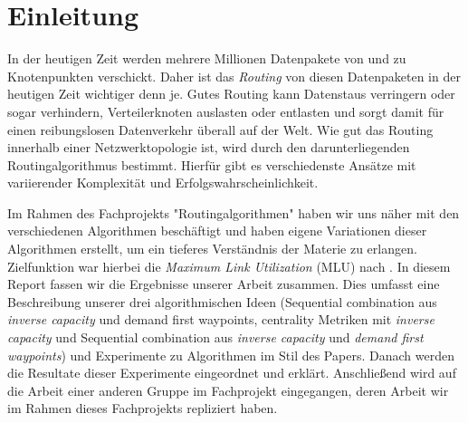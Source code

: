 \documentclass[sigconf, nonacm, review]{acmart}
\begin{document}



\maketitle

\section{Einleitung}
In der heutigen Zeit werden mehrere Millionen Datenpakete von und zu Knotenpunkten verschickt.
Daher ist das \emph{Routing} von diesen Datenpaketen in der heutigen Zeit wichtiger denn je.
Gutes Routing kann Datenstaus verringern oder sogar verhindern, Verteilerknoten auslasten oder entlasten 
und sorgt damit f\"ur einen reibungslosen Datenverkehr \"uberall auf der Welt.
Wie gut das Routing innerhalb einer Netzwerktopologie ist, 
wird durch den darunterliegenden Routingalgorithmus bestimmt.
Hierf\"ur gibt es verschiedenste Ans\"atze mit variierender Komplexit\"at und Erfolgswahrscheinlichkeit.

Im Rahmen des Fachprojekts "Routingalgorithmen" haben wir uns n\"aher mit den verschiedenen Algorithmen besch\"aftigt 
und haben eigene Variationen dieser Algorithmen erstellt,
um ein tieferes Verst\"andnis der Materie zu erlangen.
Zielfunktion war hierbei die \emph{Maximum Link Utilization} (MLU) nach \cite{foerster2021}.
In diesem Report fassen wir die Ergebnisse unserer Arbeit zusammen.
Dies umfasst eine Beschreibung unserer drei algorithmischen Ideen (Sequential combination aus \emph{inverse capacity} und demand
first waypoints, centrality Metriken mit \emph{inverse capacity} und Sequential combination aus \emph{inverse capacity} und \emph{demand first waypoints})
und Experimente zu Algorithmen im Stil des Papers\cite{foerster2021}.
Danach werden die Resultate dieser Experimente eingeordnet und erkl\"art.
Anschließend wird auf die Arbeit einer anderen Gruppe im Fachprojekt eingegangen, deren Arbeit wir im Rahmen dieses Fachprojekts repliziert haben.


\end{document}

